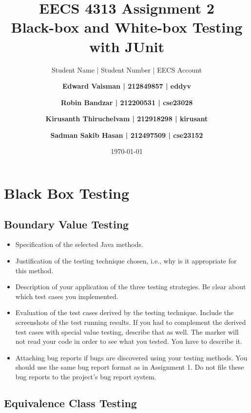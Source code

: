 \documentclass[fontsize=12pt,paper=letter,twoside]{scrartcl}
\author{Student Name | Student Number | EECS Account
\and \textbf{Edward Vaisman | 212849857 | eddyv}
\and \textbf{Robin Bandzar | 212200531 | cse23028}
\and \textbf{Kirusanth Thiruchelvam | 212918298 | kirusant}
\and \textbf{Sadman Sakib Hasan | 212497509 | cse23152}
}
\date{\today} %
\begin{document}
\title{EECS 4313 Assignment 2 \\Black-box and White-box Testing with JUnit}
\maketitle

\newpage

\tableofcontents


\newpage



\section{Black Box Testing}

\subsection{Boundary Value Testing}

\begin{itemize}
\item Specification of the selected Java methods.
\item Justification of the testing technique chosen, i.e., why is it appropriate for this method.
\item Description of your application of the three testing strategies. Be clear about which test cases
you implemented.
\item Evaluation of the test cases derived by the testing technique. Include the screenshots of the
test running results. If you had to complement the derived test cases with special value 
testing, describe that as well. The marker will not read your code in order to see what you
tested. You have to describe it.
\item Attaching bug reports if bugs are discovered using your testing methods. You should use the
same bug report format as in Assignment 1. Do not file these bug reports to the project’s bug
report system. 
\end{itemize}

\newpage
\subsection{Equivalence Class Testing}
\end{document}
